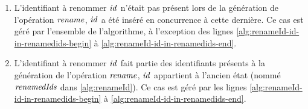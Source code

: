 \begin{enumerate}
    \item L'identifiant à renommer $\mathit{id}$ n'était pas présent lors de la génération de l'opération $\mathit{rename}$, \ie $\mathit{id}$ a été inséré en concurrence à cette dernière\footnotemark.
        Ce cas est géré par l'ensemble de l'algorithme, à l'exception des lignes \ref{alg:renameId-id-in-renamedids-begin} à \ref{alg:renameId-id-in-renamedids-end}.
        \label{item:renameId-id-not-in-former-state}
    \item L'identifiant à renommer $\mathit{id}$ fait partie des identifiants présents à la génération de l'opération $\mathit{rename}$, \ie $\mathit{id}$ appartient à l'ancien état (nommé $\mathit{renamedIds}$ dans \autoref{alg:renameId}).
        Ce cas est géré par les lignes \ref{alg:renameId-id-in-renamedids-begin} à \ref{alg:renameId-id-in-renamedids-end}.
        \label{item:renameId-id-in-former-state}
\end{enumerate}

